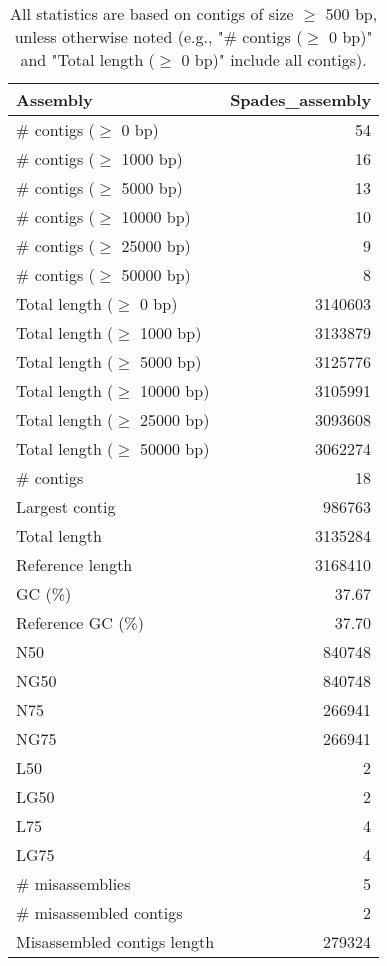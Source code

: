 \documentclass[12pt,a4paper]{article}
\begin{document}
\begin{table}[ht]
\begin{center}
\caption{All statistics are based on contigs of size $\geq$ 500 bp, unless otherwise noted (e.g., "\# contigs ($\geq$ 0 bp)" and "Total length ($\geq$ 0 bp)" include all contigs).}
\begin{tabular}{|l*{1}{|r}|}
\hline
Assembly & Spades\_assembly \\ \hline
\# contigs ($\geq$ 0 bp) & 54 \\ \hline
\# contigs ($\geq$ 1000 bp) & 16 \\ \hline
\# contigs ($\geq$ 5000 bp) & 13 \\ \hline
\# contigs ($\geq$ 10000 bp) & 10 \\ \hline
\# contigs ($\geq$ 25000 bp) & 9 \\ \hline
\# contigs ($\geq$ 50000 bp) & 8 \\ \hline
Total length ($\geq$ 0 bp) & 3140603 \\ \hline
Total length ($\geq$ 1000 bp) & 3133879 \\ \hline
Total length ($\geq$ 5000 bp) & 3125776 \\ \hline
Total length ($\geq$ 10000 bp) & 3105991 \\ \hline
Total length ($\geq$ 25000 bp) & 3093608 \\ \hline
Total length ($\geq$ 50000 bp) & 3062274 \\ \hline
\# contigs & 18 \\ \hline
Largest contig & 986763 \\ \hline
Total length & 3135284 \\ \hline
Reference length & 3168410 \\ \hline
GC (\%) & 37.67 \\ \hline
Reference GC (\%) & 37.70 \\ \hline
N50 & 840748 \\ \hline
NG50 & 840748 \\ \hline
N75 & 266941 \\ \hline
NG75 & 266941 \\ \hline
L50 & 2 \\ \hline
LG50 & 2 \\ \hline
L75 & 4 \\ \hline
LG75 & 4 \\ \hline
\# misassemblies & 5 \\ \hline
\# misassembled contigs & 2 \\ \hline
Misassembled contigs length & 279324 \\ \hline

\end{tabular}
\end{center}
\end{table}
\end{document}
